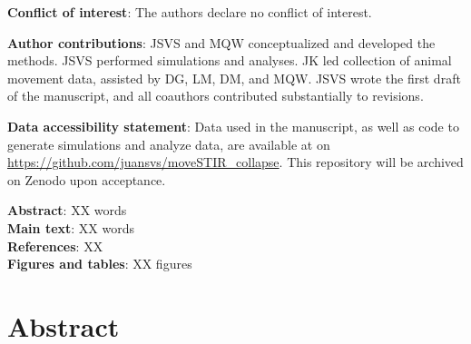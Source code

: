 \documentclass[letterpaper]{article}
\begin{document}
\noindent
\textbf{Conflict of interest}: The authors declare no conflict of interest.

\bigskip
\noindent
\textbf{Author contributions}: JSVS and MQW conceptualized and developed the methods. JSVS performed simulations and analyses. JK led collection of animal movement data, assisted by DG, LM, DM, and MQW. JSVS wrote the first draft of the manuscript, and all coauthors contributed substantially to revisions. 

\bigskip
\noindent
\textbf{Data accessibility statement}: Data used in the manuscript, as well as code to generate simulations and analyze data, are available at on \url{https://github.com/juansvs/moveSTIR_collapse}. This repository will be archived on Zenodo upon acceptance.

\bigskip
\noindent
\textbf{Abstract}: XX words\\
\textbf{Main text}:  XX words\\
\textbf{References}: XX \\
\textbf{Figures and tables}: XX figures \\

\newpage

\doublespacing
\linenumbers

\section*{Abstract} %
\end{document}
